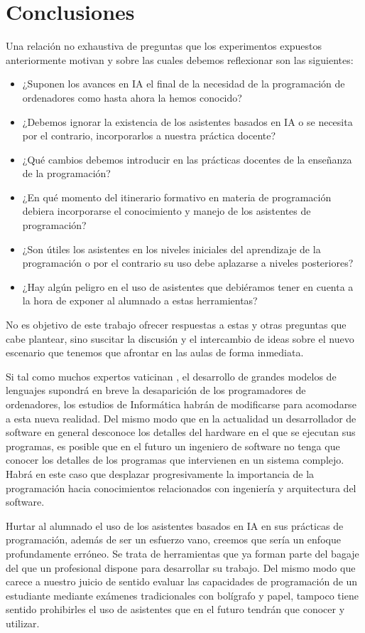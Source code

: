\documentclass[twocolumn,twoside,a4paper, 10pt]{article}
\begin{document}
\section{Conclusiones}
Una relación no exhaustiva de preguntas que los experimentos expuestos anteriormente motivan y sobre las cuales 
debemos reflexionar son las siguientes:
\begin{itemize} 
\item ¿Suponen los avances en IA el final de la necesidad de la programación de ordenadores como hasta ahora
  la hemos conocido?
\item ¿Debemos ignorar la existencia de los asistentes basados en IA o se necesita por el contrario, incorporarlos a
    nuestra práctica docente?
\item ¿Qué cambios debemos introducir en las prácticas docentes de la enseñanza de la programación?
\item ¿En qué momento del itinerario formativo en materia de programación debiera incorporarse el conocimiento
  y manejo de los asistentes de programación?
\item ¿Son útiles los asistentes en los niveles iniciales del aprendizaje de la programación o por el
  contrario su uso debe aplazarse a niveles posteriores?
\item ¿Hay algún peligro en el uso de asistentes que debiéramos tener en cuenta a la hora de exponer al
  alumnado a estas herramientas?
\end {itemize} 

No es objetivo de este trabajo ofrecer respuestas a estas y otras preguntas que cabe plantear, sino suscitar
la discusión y el intercambio de ideas sobre el nuevo escenario que tenemos que afrontar en las aulas de forma
inmediata.

Si tal como muchos expertos vaticinan 
\cite{Welsh:2023:TEoP}, 
el desarrollo de grandes modelos de lenguajes supondrá en breve la desaparición de los programadores de
ordenadores, los estudios de Informática habrán de modificarse para acomodarse a esta nueva realidad. 
Del mismo modo que en la actualidad un desarrollador de software en general desconoce los detalles del
hardware en el que se ejecutan sus programas, es posible que en el futuro un ingeniero de software no
tenga que conocer los detalles de los programas que intervienen en un sistema complejo.
Habrá en este caso que desplazar progresivamente la importancia de la programación hacia conocimientos 
relacionados con ingeniería y arquitectura del software.

Hurtar al alumnado el uso de los asistentes basados en IA en sus prácticas de programación, además de ser un
esfuerzo vano, creemos que sería un enfoque profundamente erróneo.
Se trata de herramientas que ya forman parte del bagaje del que un profesional dispone para desarrollar su trabajo.
Del mismo modo que carece a nuestro juicio de sentido evaluar las capacidades de programación de un estudiante
mediante exámenes tradicionales con bolígrafo y papel, tampoco tiene sentido prohibirles el uso de
asistentes que en el futuro tendrán que conocer y utilizar.
\end{document}
